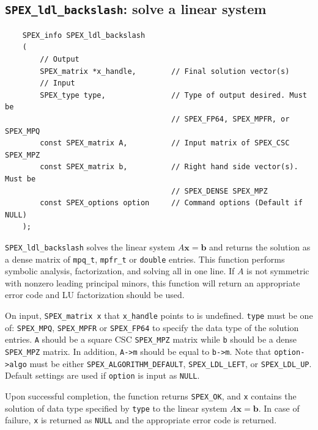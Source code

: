 \documentclass[12pt,oneside]{book}
\theoremstyle{definition}
\renewcommand{\b}{\mathbf{b}}
\newcommand{\x}{\mathbf{x}}
\begin{document}
\subsection{\texttt{SPEX\_ldl\_backslash}: solve a linear system}
\label{ss:SPEX_ldl_backslash}
\begin{mdframed}[userdefinedwidth=\textwidth]
{\footnotesize
\begin{verbatim}
    SPEX_info SPEX_ldl_backslash
    (
        // Output
        SPEX_matrix *x_handle,        // Final solution vector(s)
        // Input
        SPEX_type type,               // Type of output desired. Must be
                                      // SPEX_FP64, SPEX_MPFR, or SPEX_MPQ
        const SPEX_matrix A,          // Input matrix of SPEX_CSC SPEX_MPZ
        const SPEX_matrix b,          // Right hand side vector(s). Must be
                                      // SPEX_DENSE SPEX_MPZ 
        const SPEX_options option     // Command options (Default if NULL)
    );
\end{verbatim}
} \end{mdframed}

\verb|SPEX_ldl_backslash| solves the linear system $A\x=\b$ and returns the solution
as a dense matrix of \verb|mpq_t|, \verb|mpfr_t| or \verb|double| entries. This
function performs symbolic analysis, factorization, and solving all in one line. 
If $A$ is not symmetric with nonzero leading principal minors,
this function will return an appropriate error code and 
LU factorization should be used.

On input, \verb|SPEX_matrix x| that \verb|x_handle| points to is undefined. \verb|type| must be one of:
\verb|SPEX_MPQ|, \verb|SPEX_MPFR| or \verb|SPEX_FP64| to specify the data type
of the solution entries. \verb|A| should be a square CSC \verb|SPEX_MPZ| matrix
while \verb|b| should be a dense \verb|SPEX_MPZ| matrix. In addition, \verb|A->m|
should be equal to \verb|b->m|. Note that \verb|option->algo| must be either 
\verb|SPEX_ALGORITHM_DEFAULT|, \verb|SPEX_LDL_LEFT|, or \verb|SPEX_LDL_UP|.
Default settings are used if
\verb|option| is input as \verb|NULL|.

Upon successful completion, the function returns \verb|SPEX_OK|, and
\verb|x| contains the solution of data type specified by
\verb|type| to the linear system $A\x=\b$. In case of failure, 
\verb|x| is returned as \verb|NULL| and the appropriate error code is returned.


\end{document}
